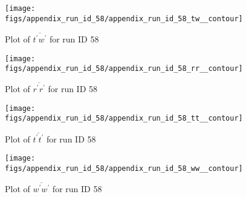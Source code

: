 \begin{figure}[H]
\centering
\texttt{[image: figs/appendix\_run\_id\_58/appendix\_run\_id\_58\_tw\_\_contour]}
\caption{Plot of $\overline{t^\prime w^\prime}$ for run ID 58}
\label{fig:appendix_run_id_58_tw__contour}
\end{figure}


\begin{figure}[H]
\centering
\texttt{[image: figs/appendix\_run\_id\_58/appendix\_run\_id\_58\_rr\_\_contour]}
\caption{Plot of $\overline{r^\prime r^\prime}$ for run ID 58}
\label{fig:appendix_run_id_58_rr__contour}
\end{figure}


\begin{figure}[H]
\centering
\texttt{[image: figs/appendix\_run\_id\_58/appendix\_run\_id\_58\_tt\_\_contour]}
\caption{Plot of $\overline{t^\prime t^\prime}$ for run ID 58}
\label{fig:appendix_run_id_58_tt__contour}
\end{figure}


\begin{figure}[H]
\centering
\texttt{[image: figs/appendix\_run\_id\_58/appendix\_run\_id\_58\_ww\_\_contour]}
\caption{Plot of $\overline{w^\prime w^\prime}$ for run ID 58}
\label{fig:appendix_run_id_58_ww__contour}
\end{figure}



